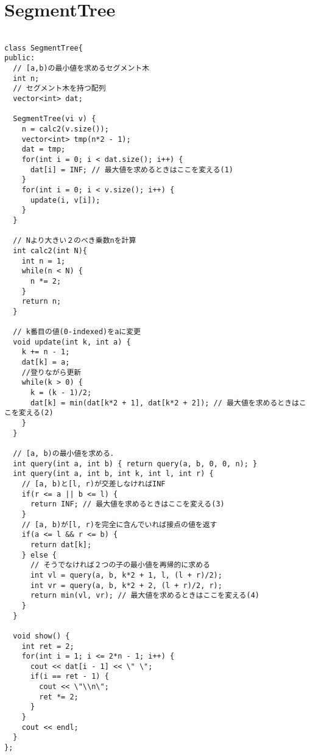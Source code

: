 \documentclass[a4j,titlepage]{jarticle} %
\begin{document}
\color{white}
\section{SegmentTree}
\color{black}
\begin{lstlisting}[caption=SegmentTree]

class SegmentTree{
public:
  // [a,b)の最小値を求めるセグメント木
  int n;
  // セグメント木を持つ配列
  vector<int> dat;

  SegmentTree(vi v) {
    n = calc2(v.size());
    vector<int> tmp(n*2 - 1);
    dat = tmp;
    for(int i = 0; i < dat.size(); i++) {
      dat[i] = INF; // 最大値を求めるときはここを変える(1)
    }
    for(int i = 0; i < v.size(); i++) {
      update(i, v[i]);
    }
  }

  // Nより大きい２のべき乗数nを計算
  int calc2(int N){
    int n = 1;
    while(n < N) {
      n *= 2;
    }
    return n;
  }

  // k番目の値(0-indexed)をaに変更
  void update(int k, int a) {
    k += n - 1;
    dat[k] = a;
    //登りながら更新
    while(k > 0) {
      k = (k - 1)/2;
      dat[k] = min(dat[k*2 + 1], dat[k*2 + 2]); // 最大値を求めるときはここを変える(2)
    }
  }

  // [a, b)の最小値を求める．
  int query(int a, int b) { return query(a, b, 0, 0, n); }
  int query(int a, int b, int k, int l, int r) {
    // [a, b)と[l, r)が交差しなければINF
    if(r <= a || b <= l) {
      return INF; // 最大値を求めるときはここを変える(3)
    }
    // [a, b)が[l, r)を完全に含んでいれば接点の値を返す
    if(a <= l && r <= b) {
      return dat[k];
    } else {
      // そうでなければ２つの子の最小値を再帰的に求める
      int vl = query(a, b, k*2 + 1, l, (l + r)/2);
      int vr = query(a, b, k*2 + 2, (l + r)/2, r);
      return min(vl, vr); // 最大値を求めるときはここを変える(4)
    }
  }

  void show() {
    int ret = 2;
    for(int i = 1; i <= 2*n - 1; i++) {
      cout << dat[i - 1] << \" \";
      if(i == ret - 1) {
        cout << \"\\n\";
        ret *= 2;
      }
    }
    cout << endl;
  }
};

\end{lstlisting}

\color{white}
\end{document}
